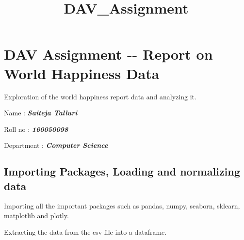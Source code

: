 \documentclass[11pt]{article}
\title{DAV\_Assignment}
\begin{document}
    
    
    \maketitle
    
    

    
    \section{DAV Assignment -\/- Report on World Happiness
Data}\label{dav-assignment----report-on-world-happiness-data}

Exploration of the world happiness report data and analyzing it.

Name : \textbf{\emph{Saiteja Talluri}}

Roll no : \textbf{\emph{160050098}}

Department : \textbf{\emph{Computer Science}}

    \subsection{Importing Packages, Loading and normalizing
data}\label{importing-packages-loading-and-normalizing-data}

Importing all the important packages such as pandas, numpy, seaborn,
sklearn, matplotlib and plotly.

Extracting the data from the csv file into a dataframe.
\end{document}

